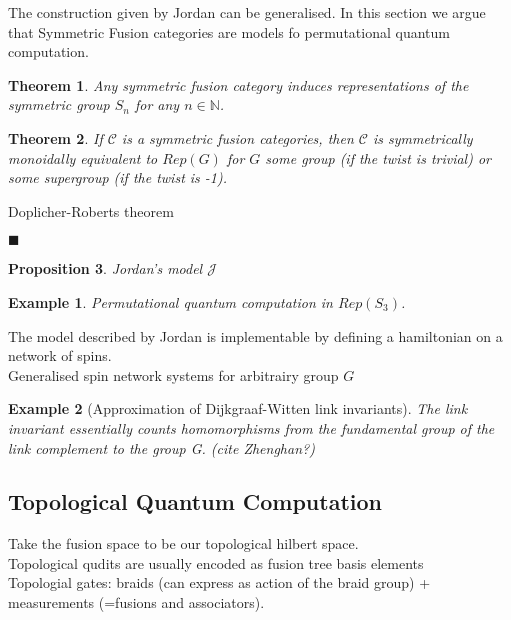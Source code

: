\documentclass{article}
\newtheorem{example}{Example}
\newtheorem{theorem}{Theorem}
\newtheorem{proposition}[theorem]{Proposition}
\newenvironment{proof}[1][Proof]{\begin{trivlist}
\item[\hskip \labelsep {\bfseries #1}]}{\begin{flushright}$\blacksquare$\end{flushright} \end{trivlist}}
\newenvironment{remark}[1][Remark]{\begin{trivlist}
\item[\hskip \labelsep {\bfseries #1}]}{\end{trivlist}}
\begin{document}
The construction given by Jordan can be generalised. In this section we argue that Symmetric Fusion categories are models fo permutational quantum computation.

\begin{theorem}
Any symmetric fusion category induces representations of the symmetric group $S_n$ for any $n\in \mathbb{N}$.
\end{theorem}

\begin{theorem}
If $\mathcal{C}$ is a symmetric fusion categories, then $\mathcal{C}$ is symmetrically monoidally equivalent to $Rep(G)$ for $G$ some group (if the twist is trivial) or some supergroup (if the twist is -1).
\end{theorem}
\begin{proof}
Doplicher-Roberts theorem
\end{proof}

\begin{proposition}
Jordan's model $\mathcal{J}$
\end{proposition}
\begin{example}
Permutational quantum computation in $Rep(S_3)$.
\end{example}

\begin{remark}
	The model described by Jordan is implementable by defining a hamiltonian on a network of spins.\\
	Generalised spin network systems for arbitrairy group $G$
\end{remark}

\begin{example}[Approximation of Dijkgraaf-Witten link invariants]
	The link invariant essentially counts homomorphisms from the fundamental group
	of the link complement to the group G. (cite Zhenghan?)
\end{example}



\subsection{Topological Quantum Computation}

Take the fusion space to be our topological hilbert space.\\
Topological qudits are usually encoded as fusion tree basis elements\\
Topologial gates: braids (can express as action of the braid group) + measurements (=fusions and associators).
\end{document}
